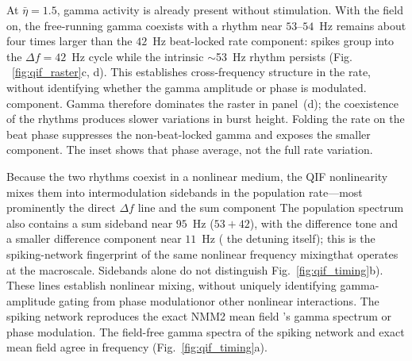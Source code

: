 \documentclass[11pt,a4paper]{article}
\providecommand{\DIFaddtex}[1]{{\protect\color{blue} \sf #1}} %
\providecommand{\DIFdeltex}[1]{{\protect\color{red} \scriptsize #1}} %
\providecommand{\DIFaddbegin}{} %
\providecommand{\DIFaddend}{} %
\providecommand{\DIFdelbegin}{} %
\providecommand{\DIFdelend}{} %
\providecommand{\DIFadd}[1]{\texorpdfstring{\DIFaddtex{#1}}{#1}} %
\providecommand{\DIFdel}[1]{\texorpdfstring{\DIFdeltex{#1}}{}} %
\begin{document}
\DIFadd{At $\bar\eta=1.5$, gamma activity is already present without stimulation. With the
field on, }\DIFaddend the \DIFdelbegin \DIFdel{free-running gamma coexists with a
}\DIFdelend \DIFaddbegin \DIFadd{rhythm near $53$--$54$~Hz remains about four times larger than the
$42$~Hz }\DIFaddend beat-locked \DIFdelbegin \DIFdel{rate component: spikes group into
the $\Delta f=42$~Hz cycle while the
intrinsic $\sim$53~Hz rhythm persists
(Fig.
~\ref{fig:qif_raster}c, d). This establishes cross-frequency structure in the
rate, without identifying whether the gamma amplitude or phase is modulated. }\DIFdelend \DIFaddbegin \DIFadd{component. Gamma therefore dominates the raster in panel~(d);
the coexistence of the rhythms produces slower variations in burst height. Folding the
rate on the beat phase suppresses the non-beat-locked gamma and exposes the smaller
component. The inset shows that phase average, not the full rate variation.
}\DIFaddend

\DIFdelbegin \DIFdel{Because the two rhythms coexist
in a nonlinear medium, the QIF nonlinearity mixes them into intermodulation sidebands in the population rate---most prominently the direct $\Delta f$ line and the sum component}\DIFdelend \DIFaddbegin \DIFadd{The population spectrum also contains a sum sideband }\DIFaddend near $95$~Hz \DIFdelbegin \DIFdel{($53\!+\!42$), with the difference tone }\DIFdelend \DIFaddbegin \DIFadd{and a smaller
difference component }\DIFaddend near $11$~Hz (\DIFdelbegin \DIFdel{the detuning itself); this is
the spiking-network fingerprint of the same nonlinear frequency mixingthat operates at the
macroscale. Sidebands alone do not distinguish }\DIFdelend \DIFaddbegin \DIFadd{Fig.~\ref{fig:qif_timing}b). These lines establish
nonlinear mixing, without uniquely identifying }\DIFaddend gamma-amplitude gating \DIFdelbegin \DIFdel{from phase
modulationor other nonlinear interactions. The spiking network reproduces
the exact NMM2 mean field
's gamma spectrum }\DIFdelend \DIFaddbegin \DIFadd{or phase
modulation. The field-free gamma spectra of the spiking network and exact mean field
agree in frequency }\DIFaddend (Fig.~\ref{fig:qif_timing}a).
\end{document}
